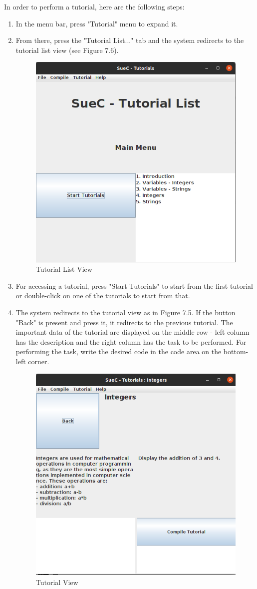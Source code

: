 \documentclass[12pt,a4paper,twoside]{report}
\begin{document}
In order to perform a tutorial, here are the following steps:
\begin{enumerate}
\item In the menu bar, press "Tutorial" menu to expand it.
\item From there, press the "Tutorial List..." tab and the system redirects to the tutorial list view (see Figure 7.6).

\begin{figure}[H]
    \centering
    \includegraphics[width=0.55\linewidth]{img/userGuide/TutorialListMenu.png}
    \caption{Tutorial List View}
    \label{fig:conf}
\end{figure}

\item For accessing a tutorial, press "Start Tutorials" to start from the first tutorial or double-click on one of the tutorials to start from that.

\item The system redirects to the tutorial view as in Figure 7.5. If the button "Back" is present and press it, it redirects to the previous tutorial. The important data of the tutorial are displayed on the middle row - left column has the description and the right column has the task to be performed. For performing the task, write the desired code in the code area on the bottom-left corner.

\begin{figure}[H]
    \centering
    \includegraphics[width=0.6\linewidth]{img/userGuide/TutorialDialog.png}
    \caption{Tutorial View}
    \label{fig:conf}
\end{figure}


\end{enumerate}
\end{document}
